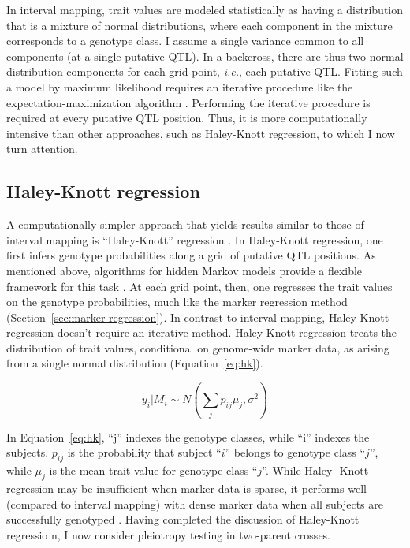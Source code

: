 \documentclass[oneside]{book}\usepackage[]{graphicx}\usepackage[]{color}
\begin{document}
In interval mapping, trait values are modeled statistically as having a 
distribution 
that is a mixture of normal distributions, where each component in the mixture 
corresponds to a genotype class. I assume a single variance common to all 
components (at a single 
putative QTL). In a backcross, there are thus two normal distribution 
components for 
each grid point, \emph{i.e.}, each putative QTL. Fitting such a model by 
maximum 
likelihood requires an iterative procedure like the expectation-maximization 
algorithm 
\citep{dempster1977maximum}. Performing the iterative procedure is required at every 
putative QTL position. Thus, it is more computationally intensive than other approaches, 
such as Haley-Knott regression, to which I now turn attention.


\subsection{Haley-Knott regression}\label{sec:haley-knott}

A computationally simpler approach that yields results similar to those of interval 
mapping is ``Haley-Knott'' regression \citep{haley1992simple, martinez1992estimating}. 
In Haley-Knott regression, one first infers genotype probabilities along a grid of 
putative QTL positions. As mentioned above, algorithms for hidden Markov models provide 
a flexible framework for this task \citep{broman2006use,broman2009guide}. At each grid point, then, one regresses the trait values on the genotype probabilities, much like the marker regression method (Section~\ref{sec:marker-regression}). In contrast to interval mapping, Haley-Knott regression doesn't require an iterative method. Haley-Knott regression treats the distribution of trait values, conditional on genome-wide marker data, as arising from a single normal distribution (Equation~\ref{eq:hk}). 

\begin{equation}
y_i|M_i \sim N(\sum_j p_{ij}\mu_j, \sigma^2)
\label{eq:hk}
\end{equation}

In Equation~\ref{eq:hk}, ``j'' indexes the genotype classes, while ``i'' indexes the 
subjects. $p_{ij}$ is the probability that subject ``$i$'' belongs to genotype class 
``$j$'', while $\mu_j$ is the mean trait value for genotype class ``$j$''. While Haley
-Knott regression may be insufficient when marker data is sparse, it performs well 
(compared to interval mapping) with dense marker data when all subjects are successfully 
genotyped \citep{broman2009guide}. Having completed the discussion of Haley-Knott regressio
n, I now consider pleiotropy testing in two-parent crosses. 
\end{document}
